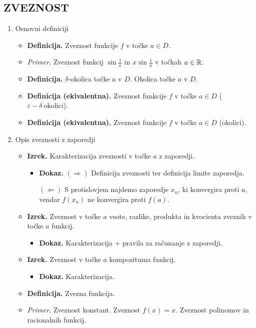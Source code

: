 \subsection{ZVEZNOST}
\begin{enumerate}
    \item Osnovni definiciji
    \begin{itemize}        
        \item \colorbox{purple!30}{\textbf{Definicija.}} Zveznost funkcije $f$ v točke $a \in D$.
        \item \colorbox{yellow!30}{\emph{Primer.}} Zveznost funkcij $\sin \frac{1}{x}$ in $x \sin \frac{1}{x}$ v točkah $a \in \mathbb{R}$.
        \item \colorbox{purple!30}{\textbf{Definicija.}} $\delta$-okolica točke $a$ v $D$. Okolica točke $a$ v $D$.
        \item \colorbox{purple!30}{\textbf{Definicija (ekivalentna).}} Zveznost funkcije $f$ v točke $a \in D$ ($\varepsilon-\delta \ \text{okolici}$).
        \item \colorbox{purple!30}{\textbf{Definicija (ekivalentna).}} Zveznost funkcije $f$ v točke $a \in D$ (okolici). 
    \end{itemize}

    \item Opis zveznosti z zaporedji
    \begin{itemize}
        \item \colorbox{blue!30}{\textbf{Izrek.}} Karakterizacija zveznosti v točke $a$ z zaporedji.
        \begin{itemize}
            \item \colorbox{green!30}{\textbf{Dokaz.}} $(\Rightarrow)$ Definicija zveznosti ter definicija limite zaporedja.
            
            $(\Leftarrow)$ S protislovjem najdemo zaporedje $x_n$, ki konvergira proti $a$, vendar $f(x_n)$ ne konvergira proti $f(a)$.
        \end{itemize}
        \item \colorbox{blue!30}{\textbf{Izrek.}} Zveznost v točke $a$ vsote, razlike, produkta in kvocienta zveznih v točke $a$ funkcij.
        \begin{itemize}
            \item \colorbox{green!30}{\textbf{Dokaz.}} Karakterizacija + pravila za računanje z zaporedji.
        \end{itemize}
        \item \colorbox{blue!30}{\textbf{Izrek.}} Zveznost v točke $a$ kompozituma funkcij.
        \begin{itemize}
            \item \colorbox{green!30}{\textbf{Dokaz.}} Karakterizacija.
        \end{itemize}
        \item \colorbox{purple!30}{\textbf{Definicija.}} Zvezna funkcija.
        \item \colorbox{yellow!30}{\emph{Primer.}} Zveznost konstant. Zveznost $f(x) = x$. Zveznost polinomov in racionalnih funkcij.
    \end{itemize}


\end{enumerate}

